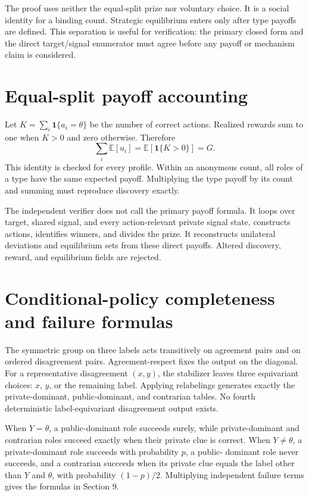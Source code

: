 \documentclass[11pt]{article}
\newcommand{\E}{\mathbb{E}}
\begin{document}
The proof uses neither the equal-split prize nor voluntary choice. It is a social
identity for a binding count. Strategic equilibrium enters only after type
payoffs are defined. This separation is useful for verification: the primary
closed form and the direct target/signal enumerator must agree before any payoff
or mechanism claim is considered.

\section{Equal-split payoff accounting}

Let $K=\sum_i\mathbf1\{a_i=\theta\}$ be the number of correct actions. Realized
rewards sum to one when $K>0$ and zero otherwise. Therefore
\[
 \sum_i\E[u_i]=\E[\mathbf1\{K>0\}]=G.
\]
This identity is checked for every profile. Within an anonymous count, all roles
of a type have the same expected payoff. Multiplying the type payoff by its
count and summing must reproduce discovery exactly.

The independent verifier does not call the primary payoff formula. It loops
over target, shared signal, and every action-relevant private signal state,
constructs actions, identifies winners, and divides the prize. It reconstructs
unilateral deviations and equilibrium sets from these direct payoffs. Altered
discovery, reward, and equilibrium fields are rejected.

\section{Conditional-policy completeness and failure formulas}

The symmetric group on three labels acts transitively on agreement pairs and on
ordered disagreement pairs. Agreement-respect fixes the output on the diagonal.
For a representative disagreement $(x,y)$, the stabilizer leaves three
equivariant choices: $x$, $y$, or the remaining label. Applying relabelings
generates exactly the private-dominant, public-dominant, and contrarian tables.
No fourth deterministic label-equivariant disagreement output exists.

When $Y=\theta$, a public-dominant role succeeds surely, while private-dominant
and contrarian roles succeed exactly when their private clue is correct. When
$Y\ne\theta$, a private-dominant role succeeds with probability $p$, a public-
dominant role never succeeds, and a contrarian succeeds when its private clue
equals the label other than $Y$ and $\theta$, with probability $(1-p)/2$.
Multiplying independent failure terms gives the formulas in Section 9.
\end{document}
